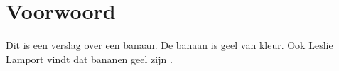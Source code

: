 \chapter{Voorwoord}

Dit is een verslag over een \gls{banaan}. 
De banaan is geel van kleur. 
Ook Leslie Lamport vindt dat bananen geel zijn \cite{lamport94}.
